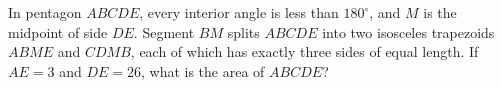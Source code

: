 In pentagon $ABCDE$, every interior angle is less than $180^\circ$, and $M$ is the midpoint of side $DE$. Segment $BM$ splits $ABCDE$ into two isosceles trapezoids $ABME$ and $CDMB$, each of which has exactly three sides of equal length. If $AE=3$ and $DE=26$, what is the area of $ABCDE$?

